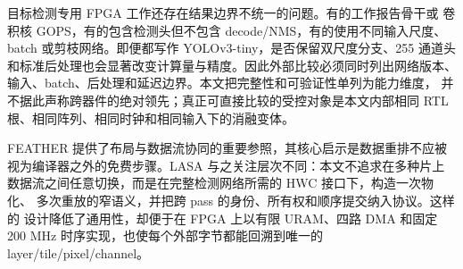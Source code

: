 目标检测专用 FPGA 工作还存在结果边界不统一的问题。有的工作报告骨干或
卷积核 GOPS，有的包含检测头但不包含 decode/NMS，有的使用不同输入尺度、
batch 或剪枝网络。即便都写作 YOLOv3-tiny，是否保留双尺度分支、255 通道头
和标准后处理也会显著改变计算量与精度。因此外部比较必须同时列出网络版本、
输入、batch、后处理和延迟边界。本文把完整性和可验证性单列为能力维度，
并不据此声称跨器件的绝对领先；真正可直接比较的受控对象是本文内部相同
RTL 根、相同阵列、相同时钟和相同输入下的消融变体。

FEATHER 提供了布局与数据流协同的重要参照，其核心启示是数据重排不应被
视为编译器之外的免费步骤。LASA 与之关注层次不同：本文不追求在多种片上
数据流之间任意切换，而是在完整检测网络所需的 HWC 接口下，构造一次物化、
多次重放的窄语义，并把跨 pass 的身份、所有权和顺序提交纳入协议。这样的
设计降低了通用性，却便于在 FPGA 上以有限 URAM、四路 DMA 和固定 200 MHz
时序实现，也使每个外部字节都能回溯到唯一的 layer/tile/pixel/channel。


